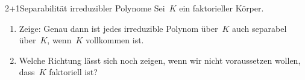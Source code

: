 \documentclass{algblatt}
\begin{document}
\begin{aufgabe}{2+1}{Separabilität irreduzibler Polynome}
Sei~$K$ ein faktorieller Körper.
\begin{enumerate}
\item Zeige: Genau dann ist jedes irreduzible Polynom
über~$K$ auch separabel über~$K$, wenn~$K$ vollkommen ist.
\item Welche Richtung lässt sich noch zeigen, wenn wir nicht voraussetzen
wollen, dass~$K$ faktoriell
ist?
\end{enumerate}
\end{aufgabe}
\end{document}
